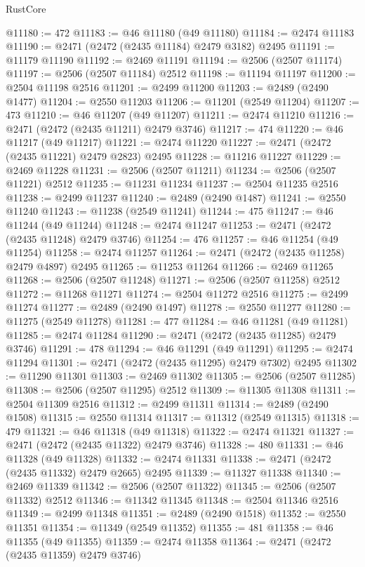 \begin{lexlean}{RustCore}
\begin{coremodule}
@11180 := 472
@11183 := @46 @11180 (@49 @11180)
@11184 := @2474 @11183
@11190 := @2471 (@2472 (@2435 @11184) @2479 @3182) @2495
@11191 := @11179 @11190
@11192 := @2469 @11191
@11194 := @2506 (@2507 @11174)
@11197 := @2506 (@2507 @11184) @2512
@11198 := @11194 @11197
@11200 := @2504 @11198 @2516
@11201 := @2499 @11200
@11203 := @2489 (@2490 @1477)
@11204 := @2550 @11203
@11206 := @11201 (@2549 @11204)
@11207 := 473
@11210 := @46 @11207 (@49 @11207)
@11211 := @2474 @11210
@11216 := @2471 (@2472 (@2435 @11211) @2479 @3746)
@11217 := 474
@11220 := @46 @11217 (@49 @11217)
@11221 := @2474 @11220
@11227 := @2471 (@2472 (@2435 @11221) @2479 @2823) @2495
@11228 := @11216 @11227
@11229 := @2469 @11228
@11231 := @2506 (@2507 @11211)
@11234 := @2506 (@2507 @11221) @2512
@11235 := @11231 @11234
@11237 := @2504 @11235 @2516
@11238 := @2499 @11237
@11240 := @2489 (@2490 @1487)
@11241 := @2550 @11240
@11243 := @11238 (@2549 @11241)
@11244 := 475
@11247 := @46 @11244 (@49 @11244)
@11248 := @2474 @11247
@11253 := @2471 (@2472 (@2435 @11248) @2479 @3746)
@11254 := 476
@11257 := @46 @11254 (@49 @11254)
@11258 := @2474 @11257
@11264 := @2471 (@2472 (@2435 @11258) @2479 @4897) @2495
@11265 := @11253 @11264
@11266 := @2469 @11265
@11268 := @2506 (@2507 @11248)
@11271 := @2506 (@2507 @11258) @2512
@11272 := @11268 @11271
@11274 := @2504 @11272 @2516
@11275 := @2499 @11274
@11277 := @2489 (@2490 @1497)
@11278 := @2550 @11277
@11280 := @11275 (@2549 @11278)
@11281 := 477
@11284 := @46 @11281 (@49 @11281)
@11285 := @2474 @11284
@11290 := @2471 (@2472 (@2435 @11285) @2479 @3746)
@11291 := 478
@11294 := @46 @11291 (@49 @11291)
@11295 := @2474 @11294
@11301 := @2471 (@2472 (@2435 @11295) @2479 @7302) @2495
@11302 := @11290 @11301
@11303 := @2469 @11302
@11305 := @2506 (@2507 @11285)
@11308 := @2506 (@2507 @11295) @2512
@11309 := @11305 @11308
@11311 := @2504 @11309 @2516
@11312 := @2499 @11311
@11314 := @2489 (@2490 @1508)
@11315 := @2550 @11314
@11317 := @11312 (@2549 @11315)
@11318 := 479
@11321 := @46 @11318 (@49 @11318)
@11322 := @2474 @11321
@11327 := @2471 (@2472 (@2435 @11322) @2479 @3746)
@11328 := 480
@11331 := @46 @11328 (@49 @11328)
@11332 := @2474 @11331
@11338 := @2471 (@2472 (@2435 @11332) @2479 @2665) @2495
@11339 := @11327 @11338
@11340 := @2469 @11339
@11342 := @2506 (@2507 @11322)
@11345 := @2506 (@2507 @11332) @2512
@11346 := @11342 @11345
@11348 := @2504 @11346 @2516
@11349 := @2499 @11348
@11351 := @2489 (@2490 @1518)
@11352 := @2550 @11351
@11354 := @11349 (@2549 @11352)
@11355 := 481
@11358 := @46 @11355 (@49 @11355)
@11359 := @2474 @11358
@11364 := @2471 (@2472 (@2435 @11359) @2479 @3746)

\end{coremodule}
\end{lexlean}
